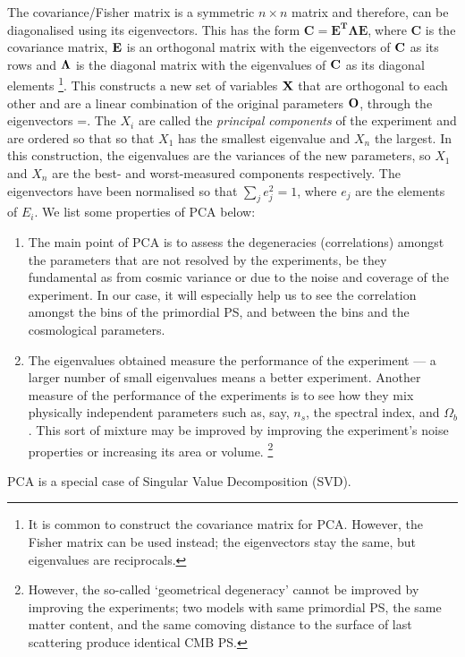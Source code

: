 {The covariance/Fisher matrix is a symmetric $n\times n$ matrix and therefore, can be diagonalised
using its eigenvectors. This has the form $\mathbf{C}=\mathbf{E^{T}}\mathbf{\Lambda}\mathbf{E}$,$\;$where
$\mathbf{C}$ is the covariance matrix, $\mathbf{{\normalcolor E}}$
is an orthogonal matrix with the eigenvectors of ${\normalcolor \mathbf{C}}$
as its rows and ${\normalcolor \mathbf{\Lambda}}$ is the diagonal
matrix with the eigenvalues of ${\normalcolor \mathbf{C}}$ as its
diagonal elements%
\footnote{It is common to construct the covariance matrix for PCA. However,
the Fisher matrix can be used instead; the eigenvectors stay the same, but
eigenvalues are reciprocals.%
}. This constructs a new set of variables $\mathbf{{\normalcolor X}}$
that are orthogonal to each other and are a linear combination of
the original parameters ${\normalcolor \mathbf{O}}$, through the eigenvectors
\setcounter{equation}{0}
\renewcommand{\theHequation}{\arabic{equation}}
%
\be
{}=\;.
\label{eq:PCA.1}
\ee
%
The $X_{i}$ are called the \emph{principal components} of the experiment
and are ordered so that so that $X_{1}$ has the smallest
eigenvalue and $X_{n}$ the largest. In this construction, the eigenvalues
are the variances of the new parameters, so $X_{1}$ and $X_{n}$ are the best- and worst-measured components respectively. The eigenvectors have
been normalised so that $\sum_{j}e_{j}^{2}=1$, where $e_{j}$ are
the elements of $E_{i}$. We list some properties of PCA below:
\begin{enumerate}
\item The main point of PCA is to assess the degeneracies (correlations) amongst the parameters
that are not resolved by the experiments, be they fundamental as from 
cosmic variance or due to the noise and coverage of the experiment.
In our case, it will especially help us to see the correlation amongst
the bins of the primordial PS, and between the bins and the cosmological
parameters.
\item The eigenvalues obtained measure the performance of the experiment
--- a larger number of small eigenvalues means a better experiment.
Another measure of the performance of the experiments is to see how
they mix physically independent parameters such as, say, $n_{s}$,
the spectral index, and $\Omega_{b}$. This sort of mixture may be
improved by improving the experiment's noise properties or increasing its area or volume.%
\footnote{However, the so-called `geometrical degeneracy'
cannot be improved by improving the experiments; two models with
same primordial PS, the same matter content, and the same comoving
distance to the surface of last scattering produce identical CMB PS.%
}
\end{enumerate}
PCA is a special case of Singular Value Decomposition (SVD).
}%

